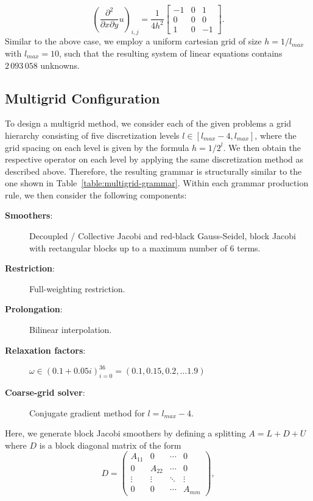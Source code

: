 \begin{equation*}
	\left(\frac{\partial^2}{\partial x \partial y} u\right)_{i,j} = 
	\frac{1}{4 h^2} \begin{bmatrix}
		-1 & 0 & 1\\
		0 & 0 & 0 \\
		1 & 0 & -1  
	\end{bmatrix}.
\end{equation*}
Similar to the above case, we employ a uniform cartesian grid of size $h = 1/l_{max}$ with $l_{max} = 10$, such that the resulting system of linear equations contains $2\,093\,058$ unknowns.
\subsection{Multigrid Configuration}
To design a multigrid method, we consider each of the given problems a grid hierarchy consisting of five discretization levels $l \in \left[l_{max} - 4, l_{max}\right]$, where the grid spacing on each level is given by the formula $h = 1/2^l$.
We then obtain the respective operator on each level by applying the same discretization method as described above.
Therefore, the resulting grammar is structurally similar to the one shown in Table~\ref{table:multigrid-grammar}.
Within each grammar production rule, we then consider the following components:
\begin{description}
	\item[\textbf{Smoothers}:] Decoupled / Collective Jacobi and red-black Gauss-Seidel, block Jacobi with rectangular blocks up to a maximum number of 6 terms.
	\item[\textbf{Restriction}:] Full-weighting restriction.
	\item[\textbf{Prolongation}:] Bilinear interpolation.
	\item[\textbf{Relaxation factors}:] $\omega \in \left( 0.1 + 0.05i \right)_{i = 0}^{36} = \left(0.1, 0.15, 0.2, \dots 1.9 \right)$
	\item[\textbf{Coarse-grid solver}:] Conjugate gradient method for $l = l_{max} - 4$.
\end{description}
Here, we generate block Jacobi smoothers by defining a splitting $A = L + D + U$ where $D$ is a block diagonal matrix of the form
\begin{equation*}
	D = 
		\begin{pmatrix}A_{11}&0&\cdots &0\\
			0&A_{22}&\cdots &0\\
			\vdots &\vdots &\ddots &\vdots \\0&0&\cdots &A_{mm}\end{pmatrix},
\end{equation*}
